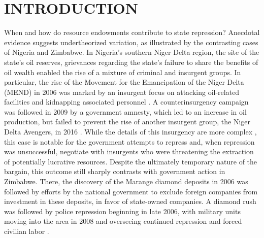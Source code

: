 



\vspace*{25pt}
\section*{\hfill INTRODUCTION \hfill}

When and how do resource endowments contribute to state repression? Anecdotal evidence suggests undertheorized variation, as illustrated by the contrasting cases of Nigeria and Zimbabwe. In Nigeria’s southern Niger Delta region, the site of the state’s oil reserves, grievances regarding the state’s failure to share the benefits of oil wealth enabled the rise of a mixture of criminal and insurgent groups. In particular, the rise of the Movement for the Emancipation of the Niger Delta (MEND) in 2006 was marked by an insurgent focus on attacking oil-related facilities and kidnapping associated personnel \cite{Asuni19,ICG06}. A counterinsurgency campaign was followed in 2009 by a government amnesty, which led to an increase in oil production, but failed to prevent the rise of another insurgent group, the Niger Delta Avengers, in 2016 \cite{BBC,Forbes}. While the details of this insurgency are more complex \cite{Nwankpa14,AghedoOsumah15}, this case is notable for the government attempts to repress and, when repression was unsuccessful, negotiate with insurgents who were threatening the extraction of potentially lucrative resources. Despite the ultimately temporary nature of the bargain, this outcome still sharply contrasts with government action in Zimbabwe. There, the discovery of the Marange diamond deposits in 2006 was followed by efforts by the national government to exclude foreign companies from investment in these deposits, in favor of state-owned companies. A diamond rush was followed by police repression beginning in late 2006, with military units moving into the area in 2008 and overseeing continued repression and forced civilian labor \cite{HRW09}. 


